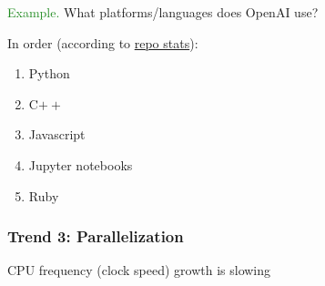 \documentclass[
    xcolor={svgnames,dvipsnames},
    hyperref={colorlinks, citecolor=DeepPink4, linkcolor=DarkRed, urlcolor=DarkBlue}
    ]{beamer}  %
\newcommand{\Eg}{\textcolor{ForestGreen}{Example. }}
\newcommand{\1}{\mathbbm 1}
\begin{document}
\begin{frame}

    \Eg What platforms/languages does OpenAI use?

        \vspace{0.5em}
    In order (according to  \href{https://github.com/openai}{repo stats}):

    \begin{enumerate}
        \item Python
        \item C$++$
        \item Javascript
        \item Jupyter notebooks
        \item Ruby
    \end{enumerate}

\end{frame}




\begin{frame}
    \frametitle{Trend 3: Parallelization}

    CPU frequency (clock speed) growth is slowing

    \begin{figure}
       \begin{center}
       \end{center}
    \end{figure}

\end{frame}
\end{document}
